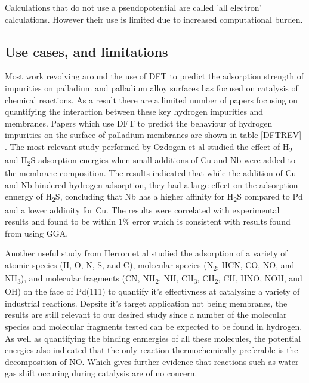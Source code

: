 Calculations that do not use a pseudopotential are called 'all electron' calculations. However their use is limited due to increased computational burden.  \cite{dftbook1}

\subsection{Use cases, and limitations}\label{DFTLIMS}

Most work revolving around the use of DFT to predict the adsorption strength of impurities on palladium and palladium alloy surfaces has focused on catalysis of chemical reactions. As a result there are a limited number of papers focusing on quantifying the interaction between these key hydrogen impurities and membranes. Papers which use DFT to predict the behaviour of hydrogen impurities on the surface of palladium membranes are shown in table \ref{DFTREV} . The most relevant study performed by Ozdogan et al \cite{ozdogan2010}  studied the effect of H\textsubscript{2} and H\textsubscript{2}S adsorption energies when small additions of Cu and Nb were added to the membrane composition. The results indicated that while the addition of Cu and Nb hindered hydrogen adsorption, they had a large effect on the adsorption ennergy of H\textsubscript{2}S, concluding that Nb has a higher affinity for H\textsubscript{2}S compared to Pd and a lower addinity for Cu. The results were correlated with experimental results and found to be within 1\% error which is consistent with results found from using GGA. 

Another useful study from Herron et al \cite{HERRON20121670} studied the adsorption of a variety of atomic species (H, O, N, S, and C), molecular species (N\textsubscript{2}, HCN, CO, NO, and NH\textsubscript{3}), and molecular fragments (CN, NH\textsubscript{2}, NH, CH\textsubscript{3}, CH\textsubscript{2}, CH, HNO, NOH, and OH) on the face of Pd(111) to quantify it's effectivness at catalysing a variety of industrial reactions. Depsite it's target application not being membranes, the results are still relevant to our desired study since a number of the molecular species and molecular fragments tested can be expected to be found in hydrogen. As well as quantifying the binding enmergies of all these molecules, the potential energies also indicated that the only reaction thermochemically preferable is the decomposition of NO. Which gives further evidence that reactions such as water gas shift occuring during catalysis are of no concern. 

